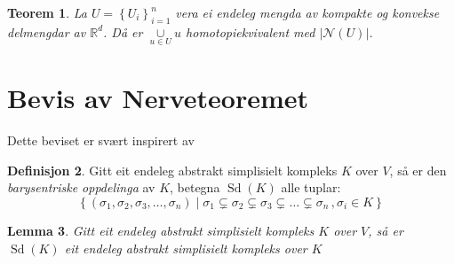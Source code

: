 \documentclass[a4paper, 12pt, norsk]{article}
\theoremstyle{plain}
\newtheorem{theorem}{Teorem}[section]
\newtheorem{lemma}[theorem]{Lemma}
\theoremstyle{definition}
\newtheorem{definition}[theorem]{Definisjon}
\newcommand{\Rb}{\mathbb{R}}
\newcommand{\Nc}{\mathcal{N}}
\newcommand{\intersect}{ \mathop{\cap}\limits } %
\newcommand{\union}{ \mathop{\cup}\limits }
\newcommand{\gr}[1]{ \lvert #1 \rvert } %
\newcommand{\set}[1]{ \left \{ #1 \right \} } %
\DeclareMathOperator{\Sd}{Sd}
\begin{document}
%	

%
%

\begin{theorem} %
	La \( U = \set{U_i}_{i=1}^n \) vera ei endeleg mengda av kompakte og konvekse delmengdar av \( \Rb^d \). Då er \( \union_{u \in U} u \) homotopiekvivalent med \( \gr{\Nc(U)} \).
\end{theorem}

\section{Bevis av Nerveteoremet}

Dette beviset er svært inspirert av \cite{https://doi.org/10.48550/arxiv.2203.03571}

\begin{definition}
	Gitt eit endeleg abstrakt simplisielt kompleks \( K \) over \( V \), så er den \emph{barysentriske oppdelinga} av \( K \), betegna \( \Sd(K) \) alle tuplar: 
	\[
		\set{(\sigma_1, \sigma_2, \sigma_3, \dots, \sigma_n) \mid \sigma_1 \subsetneq \sigma_2 \subsetneq \sigma_3 \subsetneq \dots \subsetneq \sigma_n\,, \sigma_i \in K}
	\]
\end{definition}

\begin{lemma}
	Gitt eit endeleg abstrakt simplisielt kompleks \( K \) over \( V \), så er \( \Sd(K) \) eit endeleg abstrakt simplisielt kompleks over \( K \)
\end{lemma}
\end{document}
